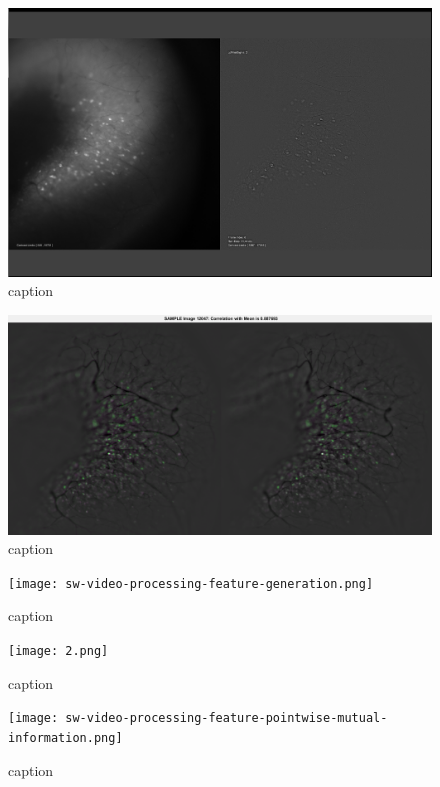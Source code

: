\begin{figure}[htb]\centering
\includegraphics[width=15cm]{Screenshot_20150608180058.png}
\caption{caption}
\end{figure}

\begin{figure}[htb]\centering
\includegraphics[width=15cm]{motion_correction_sample.png}
\caption{caption}
\end{figure}

\begin{figure}[htb]\centering
\texttt{[image: sw-video-processing-feature-generation.png]}
\caption{caption}
\end{figure}

\begin{figure}[htb]\centering
\texttt{[image: 2.png]}
\caption{caption}
\end{figure}

\begin{figure}[htb]\centering
\texttt{[image: sw-video-processing-feature-pointwise-mutual-information.png]}
\caption{caption}
\end{figure}

